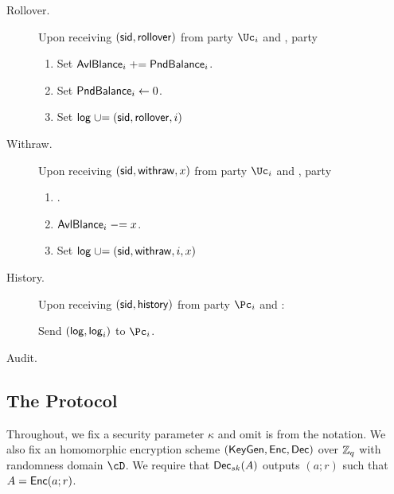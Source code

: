 \begin{functionality}
\begin{description}
		\item[Rollover.]     Upon receiving $(\mathsf{sid},\mathsf{rollover})$ from  party $\Uc_i$ and \Cc,  party \Cc
		
		\begin{enumerate}
			
			
			\item Set $\mathsf{AvlBlance}_i  \mathrel{+}= \mathsf{PndBalance}_i$.
			
			\item Set $\mathsf{PndBalance}_i  \leftarrow 0$.
			
			\item Set $\mathsf{log} \mathrel{\cup}= (\mathsf{sid},\mathsf{rollover},i)$
			
			
		\end{enumerate}

		
			\item[Withraw.]     Upon receiving $(\mathsf{sid},\mathsf{withraw},x)$ from  party $\Uc_i$ and \Cc,  party \Cc
		
		\begin{enumerate}
			
			
			 \item \Assert{$x\in \N$, $\balance_i  \ge x$ and $i \in [n]$}.
			
			\item $\mathsf{AvlBlance}_i \mathrel{-}= x$.
			
			
			\item Set $\mathsf{log} \mathrel{\cup}= {(\mathsf{sid},\mathsf{withraw},i,x)}$
			
			
		\end{enumerate}
		
		
		\item[History.]     Upon receiving $(\mathsf{sid},\mathsf{history})$ from  party $\Pc_i$ and \Cc:  
		
		Send $(\mathsf{log},\mathsf{log}_i)$ to  $\Pc_i$.	 
		
		\item[Audit.]      
		
	\end{description}

\end{functionality}


\subsection{The Protocol}\label{sec:MainProtocol:Protocol}
Throughout, we fix a security parameter $\kappa$ and omit is from the notation. We also fix an homomorphic encryption scheme $(\mathsf{KeyGen},\mathsf{Enc},\mathsf{Dec})$ over ${\mathbb Z}_q$ with randomness domain $\cD$.  We require that $\mathsf{Dec}_{sk}(A)$ outputs   $(a;r)$ such that $A = \mathsf{Enc}(a;r)$.


